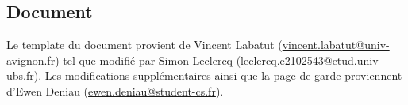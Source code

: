 \documentclass[light]{ceri/sty/rapport}
\begin{document}
\subsection{Document}
Le template du document provient de Vincent Labatut (\url{vincent.labatut@univ-avignon.fr}) tel que modifié par Simon Leclercq (\url{leclercq.e2102543@etud.univ-ubs.fr}).
Les modifications supplémentaires ainsi que la page de garde proviennent d'Ewen Deniau (\url{ewen.deniau@student-cs.fr}).

\nocite{*}
\MyBibliography
\end{document}
